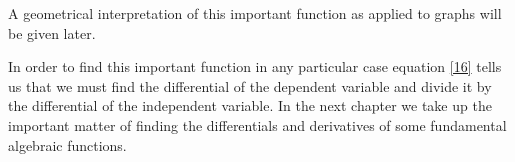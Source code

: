 A geometrical interpretation of this important function as applied to graphs will be given later.

In order to find this important function in any particular case equation \eqref{16} tells us that we must find the differential of the dependent variable and divide it by the differential of the independent variable. In the next chapter we take up the important matter of finding the differentials and derivatives of some fundamental algebraic functions.
